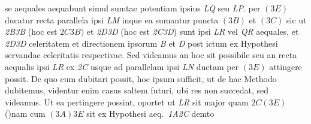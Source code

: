 %
%
se aequales aequabunt simul sumtae potentiam%
\protect{} ipsius \textit{LQ} seu \textit{LP}.  
%
%
per $({\scriptstyle \textit{3}}E)$ ducatur recta parallela ipsi \textit{LM} inque ea sumantur puncta $({\scriptstyle \textit{3}}B)$ et $({\scriptstyle \textit{3}}C)$ sic ut \textit{{\scriptsize2}B{\scriptsize3}B}  
%
(hoc est ${\scriptstyle \textit{2}}C{\scriptstyle \textit{3}}B)$ et \textit{{\scriptsize2}D{\scriptsize3}D}  
%
(hoc est \textit{{\scriptsize2}C{\scriptsize3}D}) sunt ipsi \textit{LR} vel \textit{QR} aequales,  
%
%
et \textit{{\scriptsize2}D{\scriptsize3}D} celeritatem et directionem ipsorum \textit{B} et \textit{D} post ictum%
\protect{} ex Hypothesi  
%
servandae celeritatis respectivae.%
\protect{}%
\protect{} Sed videamus an hoc sit possibile seu an recta aequalis ipsi \textit{LR} ex 
%
 \textit{{\scriptsize2}C} usque ad parallelam ipsi \textit{LN} ductam per $({\scriptstyle \textit{3}}E)$ attingere possit. De quo  
%
cum dubitari possit, hoc ipsum sufficit, ut de hac Methodo dubitemus, videntur enim casus saltem futuri, ubi res  
%
non succedat, sed videamus. Ut ea pertingere possint, oportet ut \textit{LR} sit major  
%
quam ${\scriptstyle \textit{2}}C({\scriptstyle \textit{3}}E)$ 
%
(\protect\vphantom)nam cum $({\scriptstyle \textit{3}}A){\scriptstyle \textit{3}}E$ sit ex Hypothesi  
%
aeq.\ \textit{{\scriptsize1}A{\scriptsize2}C} dem\-to  
%
